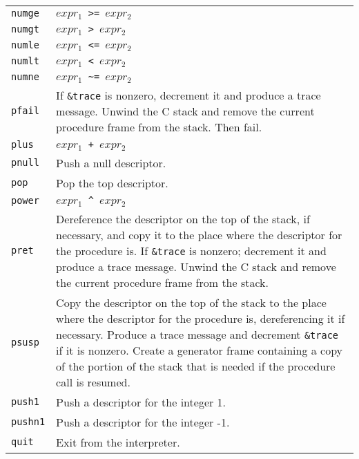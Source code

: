 \begin{supertabular}{l@{\hspace{1.5cm}}p{13.5cm}}
\texttt{numge}   & \texttt{$expr_1$ >= $expr_2$}\\

\texttt{numgt}   & \texttt{$expr_1$ > $expr_2$}\\

\texttt{numle}   & \texttt{$expr_1$ <= $expr_2$}\\

\texttt{numlt}   & \texttt{$expr_1$ < $expr_2$}\\

\texttt{numne}   & \texttt{$expr_1$ \textasciitilde= $expr_2$}\\

\texttt{pfail}   & If \texttt{\&trace} is nonzero, decrement it and produce a trace
message. Unwind the C stack and remove the current procedure frame
from the stack. Then fail.\\

\texttt{plus}    & \texttt{$expr_1$ + $expr_2$}\\

\texttt{pnull}   & Push a null descriptor.\\

\texttt{pop}     & Pop the top descriptor.\\

\texttt{power}   & \texttt{$expr_1$ \textasciicircum\ $expr_2$}\\

\texttt{pret}    & Dereference the descriptor on the top of the stack, if
necessary, and copy it to the place where the descriptor for the
procedure is. If \texttt{\&trace} is nonzero; decrement it and produce a trace
message. Unwind the C stack and remove the current procedure frame
from the stack.\\

\texttt{psusp}   & Copy the descriptor on the top of the stack to the place
where the descriptor for the procedure is, dereferencing it if
necessary. Produce a trace message and decrement \texttt{\&trace} if it is
nonzero. Create a generator frame containing a copy of the portion of
the stack that is needed if the procedure call is resumed.\\

\texttt{push1}   & Push a descriptor for the integer 1.\\

\texttt{pushn1}  & Push a descriptor for the integer -1.\\

\texttt{quit}    & Exit from the interpreter.\\


\end{supertabular}
